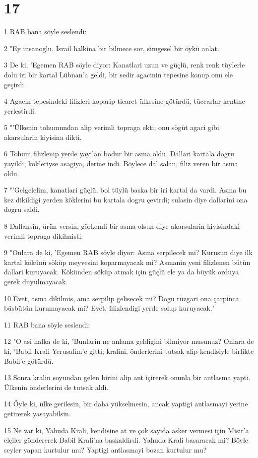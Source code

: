 \chapter{17}

\par 1 RAB bana söyle seslendi:
\par 2 "Ey insanoglu, Israil halkina bir bilmece sor, simgesel bir öykü anlat.
\par 3 De ki, 'Egemen RAB söyle diyor: Kanatlari uzun ve güçlü, renk renk tüylerle dolu iri bir kartal Lübnan'a geldi, bir sedir agacinin tepesine konup onu ele geçirdi.
\par 4 Agacin tepesindeki filizleri koparip ticaret ülkesine götürdü, tüccarlar kentine yerlestirdi.
\par 5 "'Ülkenin tohumundan alip verimli topraga ekti; onu sögüt agaci gibi akarsularin kiyisina dikti.
\par 6 Tohum filizlenip yerde yayilan bodur bir asma oldu. Dallari kartala dogru yayildi, kökleriyse asagiya, derine indi. Böylece dal salan, filiz veren bir asma oldu.
\par 7 "'Gelgelelim, kanatlari güçlü, bol tüylü baska bir iri kartal da vardi. Asma bu kez dikildigi yerden köklerini bu kartala dogru çevirdi; sulasin diye dallarini ona dogru saldi.
\par 8 Dallansin, ürün versin, görkemli bir asma olsun diye akarsularin kiyisindaki verimli topraga dikilmisti.
\par 9 "Onlara de ki, 'Egemen RAB söyle diyor: Asma serpilecek mi? Kurusun diye ilk kartal kökünü söküp meyvesini koparmayacak mi? Asmanin yeni filizlenen bütün dallari kuruyacak. Kökünden söküp atmak için güçlü ele ya da büyük orduya gerek duyulmayacak.
\par 10 Evet, asma dikilmis, ama serpilip gelisecek mi? Dogu rüzgari ona çarpinca büsbütün kurumayacak mi? Evet, filizlendigi yerde solup kuruyacak."
\par 11 RAB bana söyle seslendi:
\par 12 "O asi halka de ki, 'Bunlarin ne anlama geldigini bilmiyor musunuz? Onlara de ki, 'Babil Krali Yerusalim'e gitti; kralini, önderlerini tutsak alip kendisiyle birlikte Babil'e götürdü.
\par 13 Sonra kralin soyundan gelen birini alip ant içirerek onunla bir antlasma yapti. Ülkenin önderlerini de tutsak aldi.
\par 14 Öyle ki, ülke gerilesin, bir daha yükselmesin, ancak yaptigi antlasmayi yerine getirerek yasayabilsin.
\par 15 Ne var ki, Yahuda Krali, kendisine at ve çok sayida asker vermesi için Misir'a elçiler göndererek Babil Krali'na baskaldirdi. Yahuda Krali basaracak mi? Böyle seyler yapan kurtulur mu? Yaptigi antlasmayi bozan kurtulur mu?
